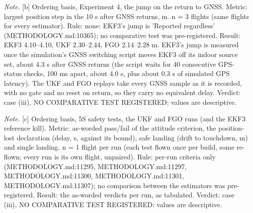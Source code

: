 \begin{table}[htbp]
\textit{Note.} [b] Ordering basis, Experiment 4, the jump on the return to GNSS. Metric: largest position step in the 10 s after GNSS returns, m. n = 3 flights (same flights for every estimator). Rule: none: EKF3's jump is 'Reported regardless' (METHODOLOGY.md:10365); no comparative test was pre-registered. Result: EKF3 4.10--4.10, UKF 2.30--2.44, FGO 2.14--2.28 m. EKF3's jump is measured once the simulation's GNSS switching script moves EKF3 off its indoor source set, about 4.3 s after GNSS returns (the script waits for 40 consecutive GPS-status checks, 100 ms apart, about 4.0 s, plus about 0.3 s of simulated GPS latency). The UKF and FGO replays take every GNSS sample as it is recorded, with no gate and no reset on return, so they carry no equivalent delay. Verdict: case (iii), NO COMPARATIVE TEST REGISTERED: values are descriptive.\par
\textit{Note.} [c] Ordering basis, 5S safety tests, the UKF and FGO runs (and the EKF3 reference kill). Metric: as-worded pass/fail of the attitude criterion, the position-lost declaration (delay, s, against its bound), safe landing (drift to touchdown, m) and single landing. n = 1 flight per run (each test flown once per build, some re-flown; every run is its own flight, unpaired). Rule: per-run criteria only (METHODOLOGY.md:11295, METHODOLOGY.md:11297, METHODOLOGY.md:11300, METHODOLOGY.md:11301, METHODOLOGY.md:11307); no comparison between the estimators was pre-registered. Result: the as-worded verdicts per run, as tabulated. Verdict: case (iii), NO COMPARATIVE TEST REGISTERED: values are descriptive.\par
\end{table}
